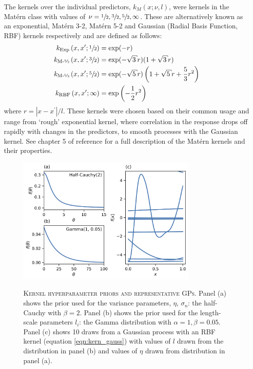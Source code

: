 The kernels over the individual predictors, $k_{M}(x; \nu, l)$, were kernels in the Mat\'{e}rn class with values of $\nu=\sfrac{1}{2},\sfrac{3}{2},\sfrac{5}{2},\infty$. These are alternatively known as an exponential, Mat\'{e}rn 3-2, Mat\'{e}rn 5-2 and  Gaussian (Radial Basis Function, RBF) kernels respectively and are defined as follows\cite{rasmussenGaussianProcessesMachine2006}: 
\begin{align}
k_{\text{Exp}}\left(x, x^{\prime}; \sfrac{1}{2}\right) &=\exp (-r) \label{eqn:kern_exp}\\
k_{\text{M-\sfrac{3}{2}}}\left(x, x^{\prime}; \sfrac{3}{2}\right) &= \exp (-\sqrt{3} r)(1+\sqrt{3} r) \label{eqn:kern_m32} \\
k_{\text{M-\sfrac{5}{2}}}\left(x, x^{\prime}; \sfrac{5}{2}\right) &= \exp (-\sqrt{5} r)\left(1+\sqrt{5} r+\frac{5}{3} r^{2}\right) \label{eqn:kern_m52}\\
k_{\text{RBF}}\left(x, x^{\prime}; \infty\right) &= \exp \left(-\frac{1}{2} r^{2}\right) \label{eqn:kern_gauss}
\end{align}
where $r = |x-x^{\prime}|/l$. These kernels were chosen based on their common usage\cite{shahriariTakingHumanOut2016} and  range from `rough' exponential kernel, where correlation in the response drops off rapidly with changes in the predictors, to smooth processes with the Gaussian kernel. See chapter 5 of  reference \cite{rasmussenGaussianProcessesMachine2006} for a full description of the Mat\'{e}rn kernels and their properties.  

\begin{figure}
    \centering
    \caption[Kernel hyperparameter priors and representative GPs]{\textsc{Kernel hyperparameter priors and representative GPs}. Panel (a) shows the prior used for the variance parameters, $\eta$, $\sigma_n$: the half-Cauchy with $\beta=2$. Panel (b) shows the prior used for the length-scale parameters $l_{i}$: the Gamma distribution with $\alpha=1, \beta=0.05$.  Panel (c) shows 10 draws from a Gaussian process with an RBF kernel (equation \ref{eqn:kern_gauss}) with values of $l$ drawn from the distribution in panel (b) and values of $\eta$ drawn from distribution in panel (a).}
    \includegraphics[width=0.8\textwidth]{chapters/msm_optimization/figures/prior_functions.png}
    \label{fig:priors}
\end{figure}

